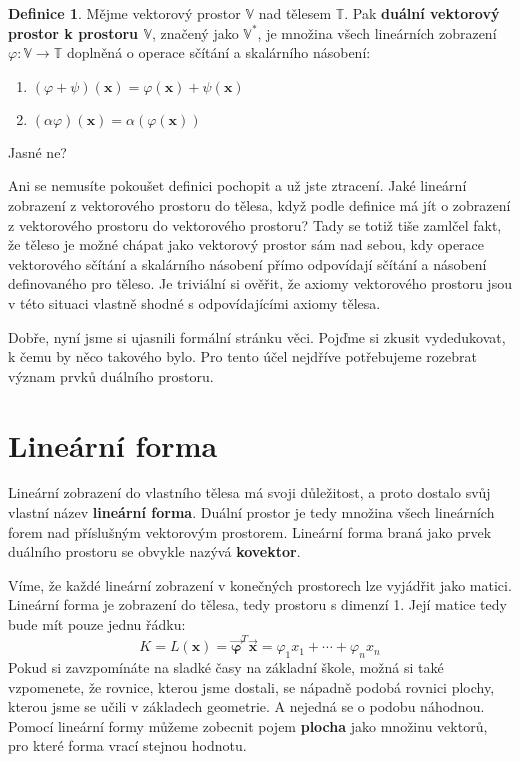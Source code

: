 \documentclass[a5paper,12pt]{amsbook}
\theoremstyle{definition}
\newtheorem{definition}{Definice}[chapter]
\newcommand{\myscalar}[1]{#1}
\newcommand{\myvec}[1]{\bm{#1}}
\newcommand{\mycoord}[1]{\overrightarrow{\mathbf{#1}}}
\newcommand{\myspace}[1]{\mathbb{#1}}
\newcommand{\mymap}[1]{#1}
\newcommand{\mydual}[1]{\myspace{#1^{*}}}
\begin{document}
\begin{definition}
Mějme vektorový prostor $\myspace{V}$ nad tělesem $\myspace{T}$. Pak \textbf{duální vektorový
prostor k prostoru $\myspace{V}$}, značený jako $\mydual{V}$, je množina všech lineárních
zobrazení $\mymap{\varphi}: \myspace{V}\rightarrow\myspace{T}$ doplněná o operace sčítání
a skalárního násobení:

\begin{enumerate}
  \item $(\mymap{\varphi} + \mymap{\psi})(\myvec{x}) = \mymap{\varphi}(\myvec{x}) + \mymap{\psi}(\myvec{x})$
  \item $(\myscalar{\alpha}\mymap{\varphi})(\myvec{x}) = \myscalar{\alpha}(\mymap{\varphi}(\myvec{x}))$
\end{enumerate}

\end{definition}

\noindent Jasné ne?

Ani se nemusíte pokoušet definici pochopit a už jste ztracení. Jaké lineární zobrazení z vektorového
prostoru do tělesa, když podle definice má jít o zobrazení z vektorového prostoru do vektorového
prostoru? Tady se totiž tiše zamlčel fakt, že těleso je možné chápat jako vektorový prostor sám
nad sebou, kdy operace vektorového sčítání a skalárního násobení přímo odpovídají sčítání a násobení
definovaného pro těleso. Je triviální si ověřit, že axiomy vektorového prostoru jsou v této situaci
vlastně shodné s odpovídajícími axiomy tělesa.

Dobře, nyní jsme si ujasnili formální stránku věci. Pojďme si zkusit vydedukovat, k čemu by něco
takového bylo. Pro tento účel nejdříve potřebujeme rozebrat význam prvků duálního prostoru.

\section{Lineární forma}

\noindent Lineární zobrazení do vlastního tělesa má svoji důležitost, a proto dostalo svůj vlastní
název \textbf{lineární forma}. Duální prostor je tedy množina všech lineárních forem nad příslušným
vektorovým prostorem. Lineární forma braná jako prvek duálního prostoru se obvykle nazývá 
\textbf{kovektor}.

Víme, že každé lineární zobrazení v konečných prostorech lze vyjádřit jako matici. Lineární forma
je zobrazení do tělesa, tedy prostoru s dimenzí 1. Její matice tedy bude mít pouze jednu řádku:
\begin{equation*}
\myscalar{K}=\mymap{L}(\myvec{x}) = \mycoord{\varphi}^T\mycoord{x} = \myscalar{\varphi_1}\myscalar{x_1} + \cdots + \myscalar{\varphi_n}\myscalar{x_n}
\end{equation*}
Pokud si zavzpomínáte na sladké časy na základní škole, možná si také vzpomenete, že rovnice, kterou
jsme dostali, se nápadně podobá rovnici plochy, kterou jsme se učili v základech geometrie. A nejedná
se o podobu náhodnou. Pomocí lineární formy můžeme zobecnit pojem \textbf{plocha} jako množinu vektorů,
pro které forma vrací stejnou hodnotu.
\end{document}
